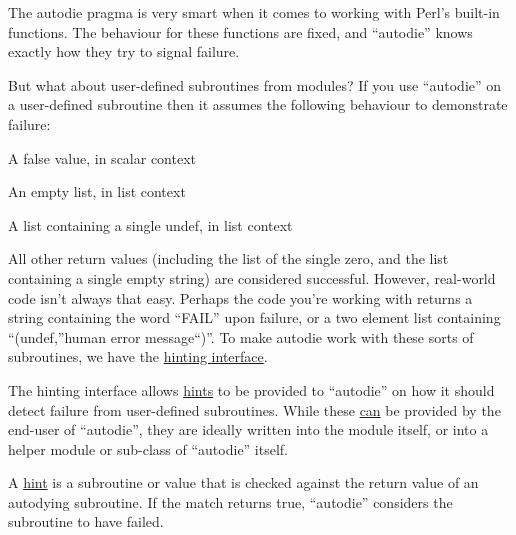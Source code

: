 \documentclass[]{article}
\renewcommand{\emph}[1]{\underline{#1}}
\begin{document}
The autodie pragma is very smart when it comes to working with Perl's
built-in functions. The behaviour for these functions are fixed, and
``autodie'' knows exactly how they try to signal failure.

But what about user-defined subroutines from modules? If you use
``autodie'' on a user-defined subroutine then it assumes the following
behaviour to demonstrate failure:

\begin{description}
\itemsep1pt\parskip0pt
\item[•]
A false value, in scalar context
\end{description}

\begin{description}
\itemsep1pt\parskip0pt
\item[•]
An empty list, in list context
\end{description}

\begin{description}
\itemsep1pt\parskip0pt
\item[•]
A list containing a single undef, in list context
\end{description}

All other return values (including the list of the single zero, and the
list containing a single empty string) are considered successful.
However, real-world code isn't always that easy. Perhaps the code you're
working with returns a string containing the word ``FAIL'' upon failure,
or a two element list containing ``(undef,''human error message``)''. To
make autodie work with these sorts of subroutines, we have the
\emph{hinting interface}.

The hinting interface allows \emph{hints} to be provided to ``autodie''
on how it should detect failure from user-defined subroutines. While
these \emph{can} be provided by the end-user of ``autodie'', they are
ideally written into the module itself, or into a helper module or
sub-class of ``autodie'' itself.


A \emph{hint} is a subroutine or value that is checked against the
return value of an autodying subroutine. If the match returns true,
``autodie'' considers the subroutine to have failed.
\end{document}
